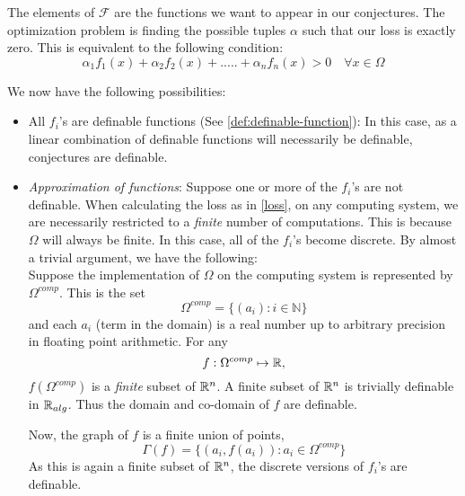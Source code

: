 The elements of $\mathcal{F}$ are the functions we want to appear in our conjectures. The optimization problem is finding the possible tuples $\alpha$ such that our loss is exactly zero. This is equivalent to the following condition:
\begin{equation}
    \label{loss}
    \alpha_1f_1(x)+\alpha_2f_2(x)+.....+\alpha_nf_n(x) > 0 \quad\forall x\in\Omega
\end{equation}

We now have the following possibilities:
\begin{itemize}
    \item All $f_i$'s are definable functions (See \ref{def:definable-function}): In this case, as a linear combination of definable functions will necessarily be definable, conjectures are definable.
    \item \textit{Approximation of functions}: Suppose one or more of the $f_i$'s are not definable. When calculating the loss as in \ref{loss}, on any computing system, we are necessarily restricted to a \textit{finite} number of computations.
          This is because $\Omega$ will always be finite. In this case, all of the $f_i$'s become discrete. By almost a trivial argument, we have the following:\\
        Suppose the implementation of $\Omega$ on the computing system is represented by $\Omega^{comp}$. This is the set
        \begin{equation*}
            \Omega^{comp} = \{(a_i) : i\in \mathbb{N}\} 
        \end{equation*}
        and each $a_i$ (term in the domain) is a real number up to arbitrary precision in floating point arithmetic.
        For any
        \begin{equation*}
            f:\Omega^{comp}\mapsto\mathbb{R},
        \end{equation*}
        $f(\Omega^{comp})$ is a \textit{finite} subset of $\mathbb{R}^n$. A finite subset of $\mathbb{R}^n$ is trivially definable in $\mathbb{R}_{alg}$. Thus the domain and co-domain of $f$ are definable.
        \par Now, the graph of $f$ is a finite union of points,
        \begin{equation}
            \label{eq:graph}
            \Gamma(f) = \{(a_i, f(a_i)): a_i\in\Omega^{comp}\}
        \end{equation}
        As this is again a finite subset of $\mathbb{R}^n$, the discrete versions of $f_i$'s are definable.
\end{itemize}

